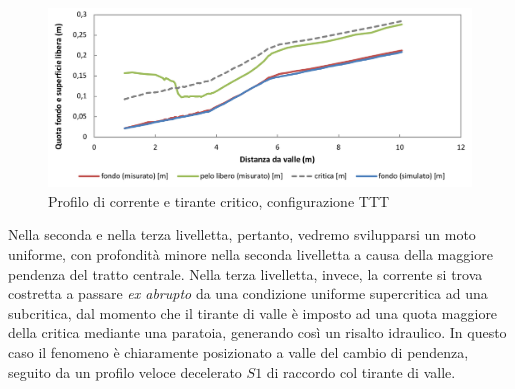 \documentclass[12pt]{article} %
\begin{document}
\begin{figure}[H]
    \centering
    \includegraphics[width=\textwidth]{TTTbasecritica.png}
    \caption{Profilo di corrente e tirante critico, configurazione TTT}
    \label{fig:critica_TTT}
\end{figure}

\noindent Nella seconda e nella terza livelletta, pertanto, vedremo svilupparsi un moto uniforme, con profondità minore nella seconda livelletta a causa della maggiore pendenza del tratto centrale. Nella terza livelletta, invece, la corrente si trova costretta a passare \textit{ex abrupto} da una condizione uniforme supercritica ad una subcritica, dal momento che il tirante di valle è imposto ad una quota maggiore della critica mediante una paratoia, generando così un risalto idraulico. In questo caso il fenomeno è chiaramente posizionato a valle del cambio di pendenza, seguito da un profilo veloce decelerato $S1$ di raccordo col tirante di valle.
\end{document}
